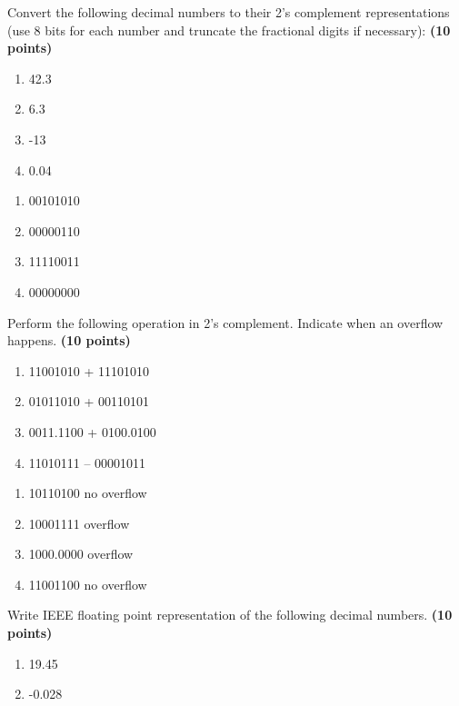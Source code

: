 \documentclass[10pt,answers]{exam}
\newcommand{\qpoints}[1]{\hfill \textbf{(#1 points)}}
\begin{document}
\begin{questions}
\question Convert the following decimal numbers to their 2’s complement representations (use 8 bits for each number and truncate the fractional digits if necessary): \qpoints{10}
\begin{enumerate}[label=\alph*)]
    \item 42.3
    \item 6.3      
    \item -13     
    \item 0.04   
\end{enumerate}

\begin{solution}
\begin{enumerate}[label=\alph*)]
	\item 00101010
	\item 00000110
	\item 11110011
	\item 00000000
\end{enumerate}
\end{solution}

\question Perform the following operation in 2’s complement. Indicate when an overflow happens. \qpoints{10}
\begin{enumerate}[label=\alph*)]
    \item 11001010  + 11101010
    \item 01011010 + 00110101  
    \item 0011.1100 + 0100.0100 
    \item 11010111 – 00001011
\end{enumerate}

\begin{solution}
\begin{enumerate}[label=\alph*)]
	\item 10110100 no overflow
	\item 10001111 overflow
	\item 1000.0000 overflow
	\item 11001100 no overflow
\end{enumerate}
\end{solution}

\newpage
\question Write IEEE floating point representation of the following decimal numbers. \qpoints{10}
\begin{enumerate}[label=\alph*)]
    \item 19.45   
    \item -0.028 
\end{enumerate}


\end{questions}
\end{document}

